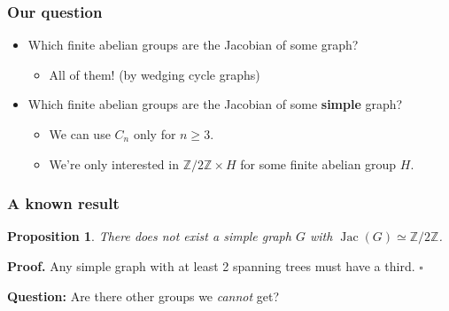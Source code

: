 \documentclass[mathserif, serif, xcolor=dvipsnames]{beamer}
\newtheorem{prop}{Proposition}
\newcommand{\Z}{\ensuremath{\mathbb{Z}}}
\DeclareMathOperator{\Jac}{Jac}
\begin{document}
\begin{frame}
  \frametitle{Our question} 

  \begin{itemize}
  \item
    Which finite abelian groups are the Jacobian of some graph?  

  \pause

  \begin{itemize}
  \item All of them! (by wedging cycle graphs)
  \end{itemize}

\medskip
  \pause
\item
  Which finite abelian groups are the Jacobian of some \textbf{simple}
  graph?
  \pause
  \begin{itemize}
  \item We can use $C_n$ only for $n\ge3$.
  \item We're only interested in $\Z/2\Z\times H$ for some finite abelian group $H$. 
  \end{itemize}
  
\end{itemize}
  
\end{frame}

\begin{frame}
 \frametitle{A known result} 
  \begin{prop}
    There does not exist a simple graph $G$ with $\Jac(G) \simeq \Z/2\Z$. 
  \end{prop}
 \vspace{0.3cm}
 
 \pause
  
 \textbf{Proof.} Any simple graph with at least 2 spanning trees must have a third. $\square$

  \pause 

  \vspace{1.8cm}

  \textbf{Question:} Are there other groups we \emph{cannot} get?
\end{frame}
\end{document}
